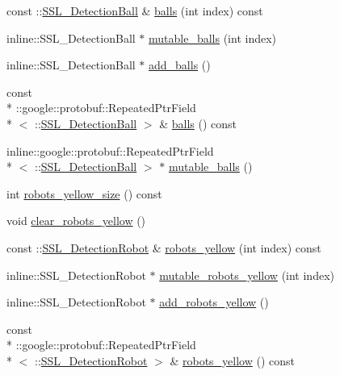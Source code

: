 \begin{DoxyCompactItemize}
\item 
const \-::\hyperlink{class_s_s_l___detection_ball}{S\-S\-L\-\_\-\-Detection\-Ball} \& \hyperlink{class_s_s_l___detection_frame_a4321af6093305cdeda46b1a06364d178}{balls} (int index) const 
\item 
inline\-::\-S\-S\-L\-\_\-\-Detection\-Ball $\ast$ \hyperlink{class_s_s_l___detection_frame_a7ddcda882ba3191644c42d92d2addf80}{mutable\-\_\-balls} (int index)
\item 
inline\-::\-S\-S\-L\-\_\-\-Detection\-Ball $\ast$ \hyperlink{class_s_s_l___detection_frame_ab8ebd9d69289d45a52bd493e2f89186c}{add\-\_\-balls} ()
\item 
const \\*
\-::google\-::protobuf\-::\-Repeated\-Ptr\-Field\\*
$<$ \-::\hyperlink{class_s_s_l___detection_ball}{S\-S\-L\-\_\-\-Detection\-Ball} $>$ \& \hyperlink{class_s_s_l___detection_frame_a64917514ee31a1d1f8cd78017b38b45c}{balls} () const 
\item 
inline\-::google\-::protobuf\-::\-Repeated\-Ptr\-Field\\*
$<$ \-::\hyperlink{class_s_s_l___detection_ball}{S\-S\-L\-\_\-\-Detection\-Ball} $>$ $\ast$ \hyperlink{class_s_s_l___detection_frame_a16e13a7cad5843e4ae2e9ff23e21ca1f}{mutable\-\_\-balls} ()
\item 
int \hyperlink{class_s_s_l___detection_frame_aaef36efa910cfdacedb2292bdef95c36}{robots\-\_\-yellow\-\_\-size} () const 
\item 
void \hyperlink{class_s_s_l___detection_frame_adf1c407c1c65b38b1e54576d9cf3ec5f}{clear\-\_\-robots\-\_\-yellow} ()
\item 
const \-::\hyperlink{class_s_s_l___detection_robot}{S\-S\-L\-\_\-\-Detection\-Robot} \& \hyperlink{class_s_s_l___detection_frame_abb321bfef94a4c423c460fd87f7eb8e5}{robots\-\_\-yellow} (int index) const 
\item 
inline\-::\-S\-S\-L\-\_\-\-Detection\-Robot $\ast$ \hyperlink{class_s_s_l___detection_frame_af6053af2f08c1b7dfc0149cb8e808771}{mutable\-\_\-robots\-\_\-yellow} (int index)
\item 
inline\-::\-S\-S\-L\-\_\-\-Detection\-Robot $\ast$ \hyperlink{class_s_s_l___detection_frame_af2c791904626f16286b62025725bc2ba}{add\-\_\-robots\-\_\-yellow} ()
\item 
const \\*
\-::google\-::protobuf\-::\-Repeated\-Ptr\-Field\\*
$<$ \-::\hyperlink{class_s_s_l___detection_robot}{S\-S\-L\-\_\-\-Detection\-Robot} $>$ \& \hyperlink{class_s_s_l___detection_frame_aefe2329358694d76b5333693f39af6ec}{robots\-\_\-yellow} () const 

\end{DoxyCompactItemize}
